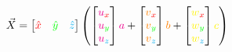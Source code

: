 \documentclass[preview]{standalone}
\begin{document}
$$\vec{X} = \begin{bmatrix}\textcolor{red}{\hat{x}}&\textcolor{green}{\hat{y}}&\textcolor{cyan}{\hat{z}}\end{bmatrix}\left(
\begin{bmatrix}\textcolor{magenta}{u}_{\textcolor{red}{x}}\\\textcolor{magenta}{u}_{\textcolor{green}{y}}\\\textcolor{magenta}{u}_{\textcolor{cyan}{z}}\end{bmatrix}\textcolor{magenta}{a} +
\begin{bmatrix}\textcolor{orange}{v}_{\textcolor{red}{x}}\\\textcolor{orange}{v}_{\textcolor{green}{y}}\\\textcolor{orange}{v}_{\textcolor{cyan}{z}}\end{bmatrix}\textcolor{orange}{b} +
\begin{bmatrix}\textcolor{yellow}{w}_{\textcolor{red}{x}}\\\textcolor{yellow}{w}_{\textcolor{green}{y}}\\\textcolor{yellow}{w}_{\textcolor{cyan}{z}}\end{bmatrix}\textcolor{yellow}{c}
\right)$$
\end{document}
